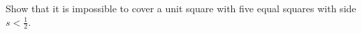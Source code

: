 Show that it is impossible to cover a unit square with five equal squares with side $s<\frac{1}{2}$.